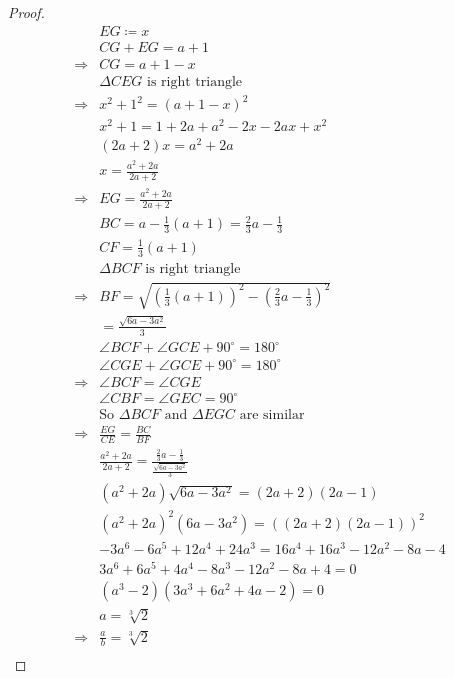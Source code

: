 \documentclass{article}
\begin{document}
\begin{proof}
        \begin{align*}
        &EG\coloneqq x\\
        &CG+EG=a+1\\
        \Rightarrow&CG=a+1-x\\
        &\Delta CEG\text{ is right triangle}\\
        \Rightarrow&x^2+1^2=(a+1-x)^2\\
        &x^2+1=1+2a+a^2-2x-2ax+x^2\\
        &(2a+2)x=a^2+2a\\
        &x=\frac{a^2+2a}{2a+2}\\
        \Rightarrow&EG=\frac{a^2+2a}{2a+2}\\
        &BC=a-\frac{1}{3}(a+1)=\frac{2}{3}a-\frac{1}{3}\\
        &CF=\frac{1}{3}(a+1)\\
        &\Delta BCF\text{ is right triangle}\\
        \Rightarrow&BF=\sqrt{\left(\frac{1}{3}(a+1)\right)^2-\left(\frac{2}{3}a-\frac{1}{3}\right)^2}\\
        &=\frac{\sqrt{6a-3a^2}}{3}\\
        &\angle BCF+\angle GCE+90^\circ=180^\circ\\
        &\angle CGE+\angle GCE+90^\circ=180^\circ\\
        \Rightarrow&\angle BCF=\angle CGE\\
        &\angle CBF=\angle GEC=90^\circ\\
        &\text{So }\Delta BCF\text{ and }\Delta EGC \text{ are similar}\\
        \Rightarrow&\frac{EG}{CE}=\frac{BC}{BF}\\
        &\frac{a^2+2a}{2a+2}=\frac{\frac{2}{3}a-\frac{1}{3}}{\frac{\sqrt{6a-3a^2}}{3}}\\
        &(a^2+2a)\sqrt{6a-3a^2}=(2a+2)(2a-1)\\
        &(a^2+2a)^2(6a-3a^2)=((2a+2)(2a-1))^2\\
        &-3a^6-6a^5+12a^4+24a^3=16a^4+16a^3-12a^2-8a-4\\
        &3a^6+6a^5+4a^4-8a^3-12a^2-8a+4=0\\
        &(a^3-2)(3a^3+6a^2+4a-2)=0\\
        &a=\sqrt[3]{2}\\
        \Rightarrow&\frac{a}{b}=\sqrt[3]{2}\\
    \end{align*}
\end{proof}
\end{document}
